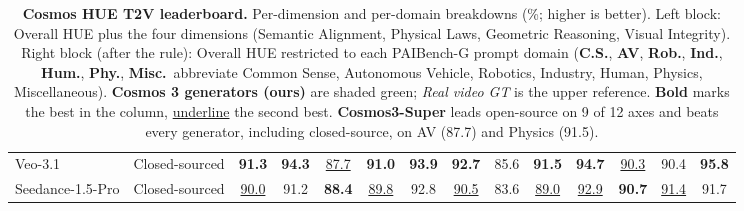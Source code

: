 \documentclass{llmxive}
\begin{document}
\begin{table}[!htbp]
\begin{tabular}{l l c cccc | ccccccc}
      \midrule
      Veo-3.1 & Closed-sourced & \textbf{91.3} & \textbf{94.3} & \underline{87.7} & \textbf{91.0} & \textbf{93.9} & \textbf{92.7} & 85.6 & \textbf{91.5} & \textbf{94.7} &
\underline{90.3} & 90.4 & \textbf{95.8} \\
      Seedance-1.5-Pro & Closed-sourced & \underline{90.0} & 91.2 & \textbf{88.4} & \underline{89.8} & 92.8 & \underline{90.5} & 83.6 & \underline{89.0} & \underline{92.9} &
\textbf{90.7} & \underline{91.4} & 91.7 \\
      \bottomrule
  \end{tabular}
\caption{\textbf{Cosmos HUE T2V leaderboard.} Per-dimension and per-domain breakdowns (\%; higher is better). Left block: Overall HUE plus the four dimensions (Semantic
Alignment, Physical Laws, Geometric Reasoning, Visual Integrity). Right block (after the rule): Overall HUE restricted to each PAIBench-G prompt domain (\textbf{C.S.}, \textbf{AV},
\textbf{Rob.}, \textbf{Ind.}, \textbf{Hum.}, \textbf{Phy.}, \textbf{Misc.}\ abbreviate Common Sense, Autonomous Vehicle, Robotics, Industry, Human, Physics, Miscellaneous).
\textbf{Cosmos 3 generators (ours)} are shaded green; \emph{Real video GT} is the upper reference. \textbf{Bold} marks the best in the column,
\underline{underline} the second best. \textbf{Cosmos3-Super} leads open-source on 9 of 12 axes and beats every generator, including closed-source, on AV (87.7) and Physics (91.5).}
\label{tab:hue_t2v_leaderboard}
\end{table}
\end{document}
